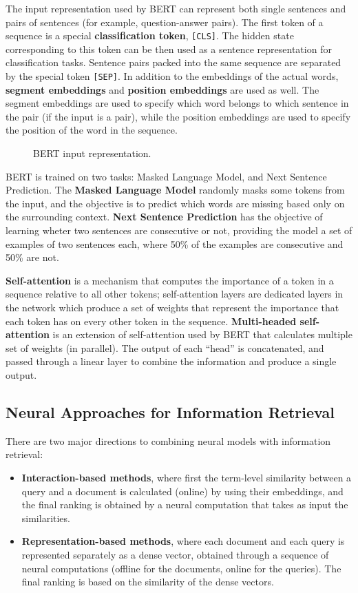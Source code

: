 The input representation used by BERT can represent both single sentences and pairs of sentences (for example, question-answer pairs). The first token of a sequence is a special \textbf{classification token}, \texttt{[CLS]}. The hidden state corresponding to this token can be then used as a sentence representation for classification tasks. Sentence pairs packed into the same sequence are separated by the special token \texttt{[SEP]}. In addition to the embeddings of the actual words, \textbf{segment embeddings} and \textbf{position embeddings} are used as well. The segment embeddings are used to specify which word belongs to which sentence in the pair (if the input is a pair), while the position embeddings are used to specify the position of the word in the sequence.
\begin{figure}[h]
    \vspace{10pt}
    \centering
    
    \caption{BERT input representation.}
\end{figure}

BERT is trained on two tasks: Masked Language Model, and Next Sentence Prediction. The \textbf{Masked Language Model} randomly masks some tokens from the input, and the objective is to predict which words are missing based only on the surrounding context. \textbf{Next Sentence Prediction} has the objective of learning wheter two sentences are consecutive or not, providing the model a set of examples of two sentences each, where 50\% of the examples are consecutive and 50\% are not.

\textbf{Self-attention} is a mechanism that computes the importance of a token in a sequence relative to all other tokens; self-attention layers are dedicated layers in the network which produce a set of weights that represent the importance that each token has on every other token in the sequence. \textbf{Multi-headed self-attention} is an extension of self-attention used by BERT that calculates multiple set of weights (in parallel). The output of each ``head'' is concatenated, and passed through a linear layer to combine the information and produce a single output.

\subsection{Neural Approaches for Information Retrieval}

There are two major directions to combining neural models with information retrieval:
\begin{itemize}
    \item \textbf{Interaction-based methods}, where first the term-level similarity between a query and a document is calculated (online) by using their embeddings, and the final ranking is obtained by a neural computation that takes as input the similarities. 
    \item \textbf{Representation-based methods}, where each document and each query is represented separately as a dense vector, obtained through a sequence of neural computations (offline for the documents, online for the queries). The final ranking is based on the similarity of the dense vectors.
\end{itemize}


